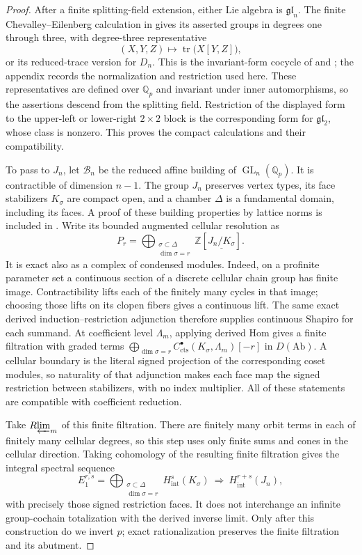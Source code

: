 \documentclass[11pt]{article}
\numberwithin{equation}{section}
\theoremstyle{definition}
\theoremstyle{remark}
\begin{document}
\begin{proof}
After a finite splitting-field extension, either Lie algebra is
$\mathfrak{gl}_n$.  The finite Chevalley--Eilenberg calculation in
 gives its asserted groups in degrees one through
three, with degree-three representative
\[
 (X,Y,Z)\longmapsto\operatorname{tr}\bigl(X[Y,Z]\bigr),
\]
or its reduced-trace version for $D_n$.
This is the invariant-form cocycle of
\cite[\S21]{ChevalleyEilenberg1948} and \cite[\S11]{Koszul1950};
the appendix records the normalization and restriction used here.
These representatives are defined over $\mathbb Q_p$ and invariant under
inner automorphisms, so the assertions descend from the splitting
field.  Restriction of the displayed form to the upper-left or
lower-right $2\times2$ block is the corresponding form for
$\mathfrak{gl}_2$, whose class is nonzero.  This proves the compact
calculations and their compatibility.

To pass to $J_n$, let $\mathcal B_n$ be the reduced affine building
of $\operatorname{GL}_n(\mathbb Q_p)$.  It is contractible of dimension $n-1$.
The group $J_n$ preserves vertex types, its face stabilizers
$K_\sigma$ are compact open, and a chamber $\Delta$ is a
fundamental domain, including its faces.  A proof of these building
properties by lattice norms is included in .
Write its bounded augmented cellular resolution as
\[
 P_r=\bigoplus_{\substack{\sigma\subset\Delta\\\dim\sigma=r}}
       \mathbb Z[\underline{J_n/K_\sigma}].
\]
It is exact also as a complex of condensed modules. Indeed, on a
profinite parameter set a continuous section of a discrete cellular
chain group has finite image. Contractibility lifts each of the finitely
many cycles in that image; choosing those lifts on its clopen fibers
gives a continuous lift. The same exact derived induction--restriction
adjunction therefore supplies continuous Shapiro for each summand.
At coefficient level \(\Lambda_m\), applying derived Hom gives a finite
filtration with graded terms
\(\bigoplus_{\dim\sigma=r}C_{\mathrm{cts}}^{\bullet}(K_\sigma,\Lambda_m)[-r]\)
in \(D(\mathrm{Ab})\).
A cellular boundary is the literal signed projection of the corresponding
coset modules, so naturality of that adjunction makes each face map the
signed restriction between stabilizers, with no index multiplier.
All of these statements are compatible with coefficient reduction.

Take \(R\!\varprojlim_m\) of this finite filtration. There are finitely many
orbit terms in each of finitely many cellular degrees, so this step uses
only finite sums and cones in the cellular direction. Taking cohomology of
the resulting finite filtration gives the integral spectral sequence
\[
 E_1^{r,s}=
 \bigoplus_{\substack{\sigma\subset\Delta\\\dim\sigma=r}}
 H^s_{\mathrm{int}}(K_\sigma)
 \ \Longrightarrow\ H^{r+s}_{\mathrm{int}}(J_n),
\]
with precisely those signed restriction faces. It does not interchange
an infinite group-cochain totalization with the derived inverse limit.
Only after this construction do we invert \(p\); exact rationalization
preserves the finite filtration and its abutment.


\end{proof}
\end{document}

